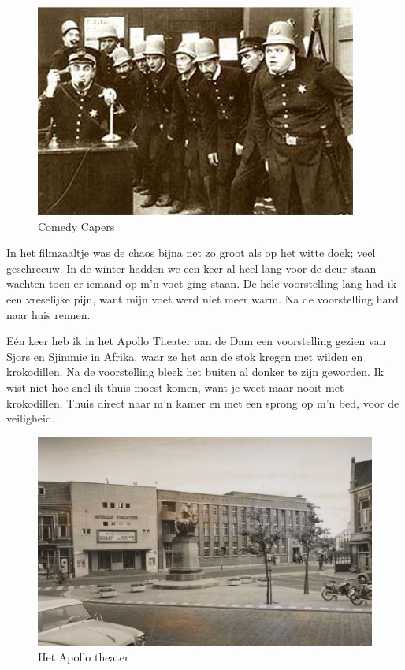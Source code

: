 \documentclass[12pt,twoside]{memoir}
\begin{document}
\begin{figure}
\includegraphics[width=\textwidth]{img/ch5/ComedyCapers}
\caption*{\footnotesize Comedy Capers}
\end{figure}

In het filmzaaltje was de chaos bijna net zo groot als op het witte doek; veel geschreeuw. In de winter hadden we een keer al heel lang voor de deur staan wachten toen er iemand op m’n voet ging staan. De hele voorstelling lang had ik een vreselijke pijn, want mijn voet werd niet meer warm. Na de voorstelling hard naar huis rennen.

Eén keer heb ik in het Apollo Theater aan de Dam een voorstelling gezien van Sjors en Sjimmie in Afrika, waar ze het aan de stok kregen met wilden en krokodillen. Na de voorstelling bleek het buiten al donker te zijn geworden. Ik wist niet hoe snel ik thuis moest komen, want je weet maar nooit met krokodillen. Thuis direct naar m’n kamer en met een sprong op m’n bed, voor de veiligheid. 

\begin{figure}
\includegraphics[width=\textwidth]{img/ch5/apollo}
\caption*{\footnotesize Het Apollo theater}
\end{figure}
\end{document}
